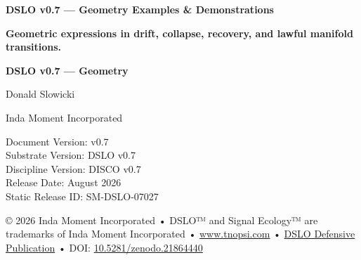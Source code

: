 \begin{titlepage}
\centering

{\Large\bfseries DSLO v0.7 — Geometry Examples \& Demonstrations\par}
\vspace{1.5em}

{\large\bfseries Geometric expressions in drift, collapse, recovery, and lawful manifold transitions.\par}
\vspace{2em}

{\Large\bfseries DSLO v0.7 --- Geometry\par}
\vspace{2em}

{\large Donald Slowicki\par}
{\small Inda Moment Incorporated\par}

\vspace{3em}

{\small
Document Version: v0.7\\
Substrate Version: DSLO v0.7\\
Discipline Version: DISCO v0.7\\
Release Date: August 2026\\
Static Release ID: SM-DSLO-07027\\
}

\vspace{3em}

{\small
© 2026 Inda Moment Incorporated • 
DSLO™ and Signal Ecology™ are trademarks of Inda Moment Incorporated • 
\href{https://www.tnopsi.com}{www.tnopsi.com} • 
\href{https://sites.google.com/tnopsi.com/dslo-protocol/defensive-publication}{DSLO Defensive Publication} • 
DOI: \href{https://zenodo.org/records/21864440}{10.5281/zenodo.21864440}
}

\end{titlepage}


